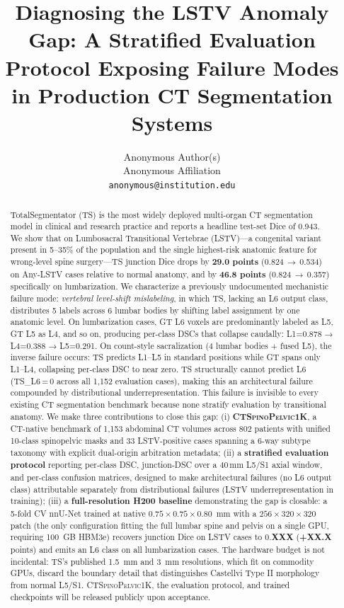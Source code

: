 \documentclass{article}
\title{Diagnosing the LSTV Anomaly Gap: A Stratified
Evaluation Protocol Exposing Failure Modes in Production CT
Segmentation Systems}
\author{%
  Anonymous Author(s) \\
  Anonymous Affiliation \\
  \texttt{anonymous@institution.edu} \\
}
\newcommand{\dataset}{\textsc{CTSpinoPelvic1K}}
\newcommand{\TS}{TotalSegmentator}
\begin{document}
\maketitle

\begin{abstract}
\TS{} (TS) is the most widely deployed multi-organ CT segmentation
model in clinical and research practice and reports a headline
test-set Dice of 0.943.
We show that on Lumbosacral Transitional Vertebrae (LSTV)---a
congenital variant present in 5--35\% of the population and the
single highest-risk anatomic feature for wrong-level spine
surgery---TS junction Dice drops by \textbf{29.0 points}
(0.824\,$\to$\,0.534) on Any-LSTV cases relative to normal
anatomy, and by \textbf{46.8 points} (0.824\,$\to$\,0.357)
specifically on lumbarization.
We characterize a previously undocumented mechanistic failure mode:
\emph{vertebral level-shift mislabeling}, in which TS, lacking an
L6 output class, distributes 5 labels across 6 lumbar bodies by
shifting label assignment by one anatomic level.
On lumbarization cases, GT L6 voxels are predominantly labeled as
L5, GT L5 as L4, and so on, producing per-class DSCs that
collapse caudally: L1=0.878 → L4=0.388 → L5=0.291.
On count-style sacralization (4 lumbar bodies + fused L5), the
inverse failure occurs: TS predicts L1--L5 in standard positions
while GT spans only L1--L4, collapsing per-class DSC to near
zero.
TS structurally cannot predict L6 (\textsc{TS\_L6}\,=\,0 across
all 1{,}152 evaluation cases), making this an architectural
failure compounded by distributional underrepresentation.
This failure is invisible to every existing CT segmentation
benchmark because none stratify evaluation by transitional
anatomy.
We make three contributions to close this gap:
(i) \textbf{\dataset{}}, a CT-native benchmark of 1{,}153 abdominal
CT volumes across 802 patients with unified 10-class spinopelvic
masks and 33 LSTV-positive cases spanning a 6-way subtype
taxonomy with explicit dual-origin arbitration metadata;
(ii) a \textbf{stratified evaluation protocol} reporting per-class
DSC, junction-DSC over a 40\,mm L5/S1 axial window, and per-class
confusion matrices, designed to make architectural failures
(no L6 output class) attributable separately from distributional
failures (LSTV underrepresentation in training);
(iii) a \textbf{full-resolution H200 baseline} demonstrating
the gap is closable: a 5-fold CV nnU-Net trained at native
$0.75\!\times\!0.75\!\times\!0.80$~mm with a
$256\!\times\!320\!\times\!320$ patch (the only configuration
fitting the full lumbar spine and pelvis on a single GPU,
requiring 100~GB HBM3e) recovers junction Dice on LSTV cases to
0.\textbf{XXX} (\textbf{+XX.X} points) and emits an L6 class on
all lumbarization cases.
The hardware budget is not incidental: TS's published
1.5~mm and 3~mm resolutions, which fit on commodity GPUs,
discard the boundary detail that distinguishes Castellvi
Type II morphology from normal L5/S1.
\dataset{}, the evaluation protocol, and trained checkpoints
will be released publicly upon acceptance.
\end{abstract}
\end{document}
